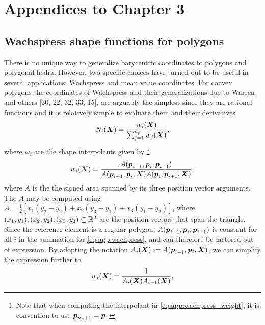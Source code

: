 \chapter{Appendices to Chapter 3}
\vspace{-5mm}
\section{Wachspress shape functions for polygons}
\label{app:C3:wachpress}
There is no unique way to generalize barycentric coordinates to polygons and polygonal hedra. However, two specific choices have turned out to be useful in several applications: Wachspress and mean value coordinates. For convex polygons the coordinates of Wachspress and their generalizations due to Warren and others [30, 22, 32, 33, 15], are arguably the simplest since they are rational functions and it is relatively simple to evaluate them and their derivatives 
%
\begin{equation}
N_i({\boldsymbol{X}})  = \frac{w_i({\boldsymbol{X}})}{\sum_{j=1}^{n_p} w_j({\boldsymbol{X}})},
\label{eq:app:wachpress}
\end{equation}
where $w_i$ are the shape interpolants given by \footnote{Note that when computing the interpolant in \eqref{eq:app:wachpress_weight}, it is convention to use ${\boldsymbol{p}}_{n_p + 1} = {\boldsymbol{p}}_1$}
%
\begin{equation}
w_i({\boldsymbol{X}})  = \frac{A({\boldsymbol{p}}_{i-1}, {\boldsymbol{p}}_{i}, {\boldsymbol{p}}_{i+1})}{A({\boldsymbol{p}}_{i-1}, {\boldsymbol{p}}_{i}, {\boldsymbol{X}}) A({\boldsymbol{p}}_{i}, {\boldsymbol{p}}_{i+1}, {\boldsymbol{X}})},
\label{eq:app:wachpress_weight}
\end{equation}
%
where $A$ is the the signed area spanned by its three position vector arguments. The $A$ may be computed using $A = \tfrac{1}{2}\left[x_1(y_2 - y_2) + x_2 (y_3 - y_1) + x_3(y_1 - y_2) \right]$, where $(x_1,y_1),(x_2,y_2), (x_3,y_3) \subseteq \mathbb{R}^2$ are the position vectors that span the triangle. Since the reference element is a regular polygon, $A({\boldsymbol{p}}_{i-1}, {\boldsymbol{p}}_{i}, {\boldsymbol{p}}_{i+1})$ is constant for all $i$ in the summation for \eqref{eq:app:wachpress}, and can therefore be factored out of expression. By adopting the notation $A_i({\boldsymbol{X}}):= A({\boldsymbol{p}}_{i-1},{\boldsymbol{p}}_{i},{\boldsymbol{X}})$, we can simplify the expression further to
%
\begin{equation}
w_i({\boldsymbol{X}}) = \frac{1}{A_{i}({\boldsymbol{X}}) A_{i+1}({\boldsymbol{X}})},
\end{equation}
%